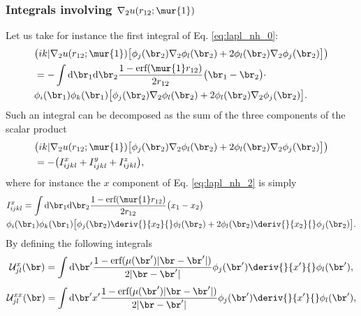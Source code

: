 \subsubsection{Integrals involving $\nabla_2u(r_{12};\mur{1})$}
Let us take for instance the first integral of Eq. \eqref{eq:lapl_nh_0}:
\begin{equation}
 \label{eq:lapl_nh_1}
 \begin{aligned}
 &\big(ik|\nabla_2 u(r_{12};\mur{1}) \big[ \phi_j(\br_2)\nabla_2 \phi_l(\br_2) + 2 \phi_l(\br_2) \nabla_2 \phi_j(\br_2)\big] \big) \\
 &= -\int \text{d}\br_{1} \text{d}\br_{2} \frac{1 - \text{erf}(\mur{1} r_{12})}{2 r_{12}} \big(\br_1 - \br_2 \big) \cdot\\
 &   \phi_i(\br_1) \phi_k(\br_1) \big[ \phi_j(\br_2)\nabla_2 \phi_l(\br_2) + 2 \phi_l(\br_2) \nabla_2 \phi_j(\br_2)\big] .
 \end{aligned}
\end{equation}
Such an integral can be decomposed as the sum of the three components of the scalar product 
\begin{equation}
 \label{eq:lapl_nh_2}
 \begin{aligned}
 &\big(ik|\nabla_2 u(r_{12};\mur{1}) \big[ \phi_j(\br_2)\nabla_2 \phi_l(\br_2) + 2 \phi_l(\br_2) \nabla_2 \phi_j(\br_2)\big] \big) \\
&=-\big( I_{ijkl}^x + I_{ijkl}^y + I_{ijkl}^z\big),
 \end{aligned}
\end{equation}
where for instance the $x$ component  of Eq. \eqref{eq:lapl_nh_2} is simply 
\begin{equation}
 \label{eq:lapl_nh_3}
 \begin{aligned}
 &I_{ijkl}^x = \int \text{d}\br_{1} \text{d}\br_{2} \frac{1 - \text{erf}(\mur{1} r_{12})}{2 r_{12}} \big(x_1 - x_2 \big) \\
 &   \phi_i(\br_1) \phi_k(\br_1) \big[ \phi_j(\br_2)\deriv{}{x_2}{} \phi_l(\br_2) + 2 \phi_l(\br_2) \deriv{}{x_2}{} \phi_j(\br_2)\big] .
 \end{aligned}
\end{equation}
By defining the following integrals
\begin{equation}
 \label{eq:u_jl}
 \mathcal{U}_{jl}^{x}(\br) = \int \text{d}\br' \frac{1 - \text{erf}(\mu (\br') |\br - \br'|)}{2 |\br - \br'|} \phi_j(\br') \deriv{}{x'}{} \phi_l(\br'),
\end{equation}
\begin{equation}
 \label{eq:ux_jl}
 \mathcal{U}_{jl}^{xx}(\br) = \int \text{d}\br' x' \frac{1 - \text{erf}(\mu (\br') |\br - \br'|)}{2 |\br - \br'|} \phi_j(\br') \deriv{}{x'}{} \phi_l(\br'),
\end{equation}
